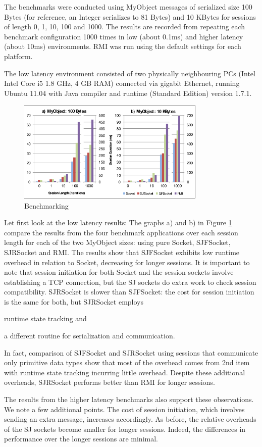 The benchmarks were conducted using MyObject messages of serialized size 100 Bytes (for reference, an Integer serializes to 81 Bytes) and 10 KBytes for sessions of length 0, 1, 10, 100 and 1000. The results are recorded from repeating each benchmark configuration 1000 times in low (about 0.1ms) and higher latency (about 10ms) environments. RMI was run using the default settings for each platform. 

The low latency environment consisted of two physically neighbouring PCs (Intel Intel Core i5 1.8 GHz, 4 GB RAM) connected via gigabit Ethernet, running Ubuntu 11.04 with Java compiler and runtime (Standard Edition) version 1.7.1. 

\begin{figure}
\centering
\includegraphics[width=0.8\textwidth]{resources/benchmarking.png}
\caption{Benchmarking}
\label{fig:benchmarking}
\end{figure}

Let first look at the low latency results: The graphs a) and b) in Figure \ref{fig:benchmarking} compare the results from the four benchmark applications over each session length for each of the two MyObject sizes: using pure Socket, SJFSocket, SJRSocket and RMI. The results show that SJFSocket exhibits low runtime overhead in relation to Socket, decreasing for longer sessions. It is important to note that session initiation for both Socket and the session sockets involve establishing a TCP connection, but the SJ sockets do extra work to check session compatibility. SJRSocket is slower than SJFSocket: the cost for session initiation is the same for both, but SJRSocket employs
\begin{compactenum}
\item runtime state tracking and
\item a different routine for serialization and communication.
\end{compactenum}

In fact, comparison of SJFSocket and SJRSocket using sessions that communicate only primitive data types \cite{thesis} show that most of the overhead comes from 2nd item with runtime state tracking incurring little overhead. Despite these additional overheads, SJRSocket performs better than RMI for longer sessions.

The results from the higher latency benchmarks \cite{thesis} also support these observations. We note a few additional points. The cost of session initiation, which involves sending an extra message, increases accordingly. As before, the relative overheads of the SJ sockets become smaller for longer sessions. Indeed, the differences in performance over the longer sessions are minimal.